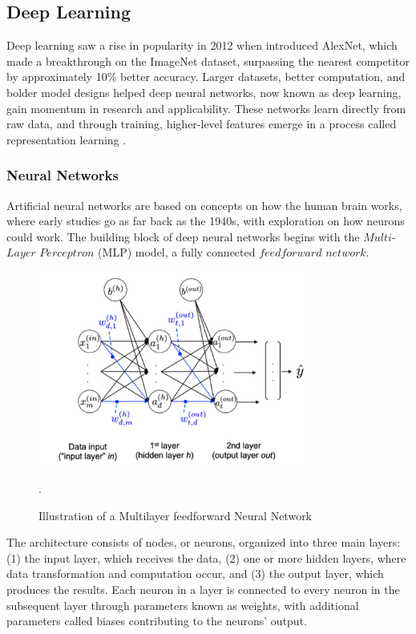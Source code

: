 \documentclass[12pt,a4paper]{article}
\begin{document}
\subsection{Deep Learning}
Deep learning saw a rise in popularity in 2012 when \cite{Krizhevsky2012} introduced AlexNet, which made a breakthrough on the ImageNet dataset, surpassing the nearest competitor by approximately 10\% better accuracy. Larger datasets, better computation, and bolder model designs helped deep neural networks, now known as deep learning, gain momentum in research and applicability. These networks learn directly from raw data, and through training, higher-level features emerge in a process called representation learning \parencite{bommasani2022opportunities}.


\subsubsection{Neural Networks} \label{neuralnetworks}
Artificial neural networks are based on concepts on how the human brain works, where early studies go as far back as the 1940s, with \cite{McCulloch1943} exploration on how neurons could work. The building block of deep neural networks begins with the $Multi$-$Layer$ $Perceptron$ (MLP) model, a fully connected $feedforward$ $network$. 

\begin{figure}[htbp]
  \centering
  \includegraphics[width=0.8\textwidth]{FFNN.png}
  \caption{Illustration of a Multilayer feedforward Neural Network \parencite{Raschka2017}}.
  \label{neural_network}
\end{figure}

The architecture consists of nodes, or neurons, organized into three main layers: (1) the input layer, which receives the data, (2) one or more hidden layers, where data transformation and computation occur, and (3) the output layer, which produces the results. Each neuron in a layer is connected to every neuron in the subsequent layer through parameters known as weights, with additional parameters called biases contributing to the neurons' output. 
\end{document}
